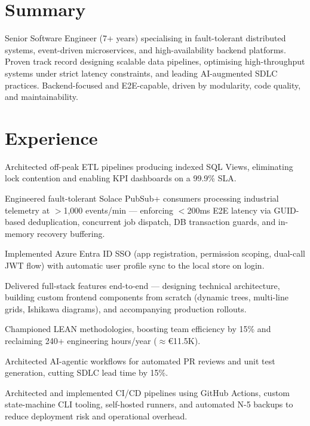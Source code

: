 \documentclass[]{styling}
\begin{document}
\begin{minipage}[t]{0.73\textwidth}
\vspace{10pt}


\section{Summary}
\justifying
Senior Software Engineer (7+ years) specialising in fault-tolerant distributed systems, event-driven microservices, and high-availability backend platforms. Proven track record designing scalable data pipelines, optimising high-throughput systems under strict latency constraints, and leading AI-augmented SDLC practices. Backend-focused and E2E-capable, driven by modularity, code quality, and maintainability.
\sectionsep


\section{Experience}
%
\vspace{2pt}
\begin{tightemize}
\item Architected off-peak ETL pipelines producing indexed SQL Views, eliminating lock contention and enabling KPI dashboards on a 99.9\% SLA.
\item Engineered fault-tolerant Solace PubSub+ consumers processing industrial telemetry at $>$1,000 events/min --- enforcing $<$200ms E2E latency via GUID-based deduplication, concurrent job dispatch, DB transaction guards, and in-memory recovery buffering.
\item Implemented Azure Entra ID SSO (app registration, permission scoping, dual-call JWT flow) with automatic user profile sync to the local store on login.
\item Delivered full-stack features end-to-end --- designing technical architecture, building custom frontend components from scratch (dynamic trees, multi-line grids, Ishikawa diagrams), and accompanying production rollouts.
\item Championed LEAN methodologies, boosting team efficiency by 15\% and reclaiming 240+ engineering hours/year ($\approx$€11.5K).
\item Architected AI-agentic workflows for automated PR reviews and unit test generation, cutting SDLC lead time by 15\%.
\item Architected and implemented CI/CD pipelines using GitHub Actions, custom state-machine CLI tooling, self-hosted runners, and automated N-5 backups to reduce deployment risk and operational overhead.
\end{tightemize}
\vspace{6pt}


\end{minipage}
\end{document}
